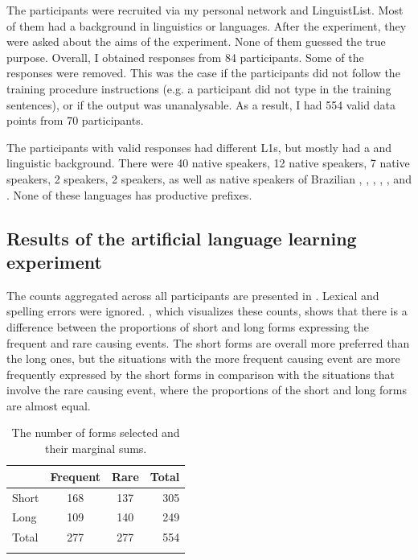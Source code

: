 \documentclass[output=paper]{langsci/langscibook}
\begin{document}
The participants were recruited via my personal network and LinguistList. Most of them had a background in linguistics or languages. After the experiment, they were asked about the aims of the experiment. None of them guessed the true purpose. Overall, I obtained responses from 84 participants. Some of the responses were removed. This was the case if the participants did not follow the training procedure instructions (e.g. a participant did not type in the training sentences), or if the output was unanalysable. As a result, I had 554 valid data points from 70 participants. 

The participants with valid responses had different L1s, but mostly had a  and  linguistic background. There were 40 native  speakers, 12 native  speakers, 7 native  speakers, 2  speakers, 2  speakers, as well as native speakers of Brazilian , , , , ,  and . None of these languages has productive  prefixes.

\subsection{Results of the artificial language learning experiment}

The counts aggregated across all participants are presented in . Lexical and spelling errors were ignored. , which visualizes these counts, shows that there is a difference between the proportions of short and long forms expressing the frequent and rare causing events. The short forms are overall more preferred than the long ones, but the situations with the more frequent causing event are more frequently expressed by the short forms in comparison with the situations that involve the rare causing event, where the proportions of the short and long forms are almost equal.

\begin{table}
\begin{tabularx}{.8\textwidth}{XSS@{\qquad\qquad}r} 
\lsptoprule
& Frequent & Rare &  {Total}\\
\midrule
Short & 168 & 137 &  {305}\\
Long & 109 & 140 &  {249}\\
\midrule 
 {Total} &  {277} &  {277} &  {554}\\
\lspbottomrule
\end{tabularx} 
\caption{The number of forms selected and their marginal sums.}
\label{tab:levshina:1}
\end{table}
\end{document}
